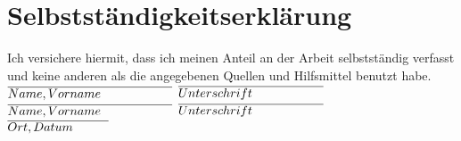 \section{Selbstständigkeitserklärung}
\label{sec:Selbstständigkeitserklärung}

Ich versichere hiermit, dass ich meinen Anteil an der Arbeit selbstständig verfasst und keine anderen als die angegebenen Quellen und Hilfsmittel benutzt habe.\\[2cm]

$\overline{Name, Vorname\hphantom{spaces}\hphantom{spaces}}$ \hfill $\overline{Unterschrift\hphantom{spaces}\hphantom{spaces}}$\\[1cm]

$\overline{Name, Vorname\hphantom{spaces}\hphantom{spaces}}$ \hfill $\overline{Unterschrift\hphantom{spaces}\hphantom{spaces}}$\\[2cm]

$\overline{Ort, Datum\hphantom{spaces}}$